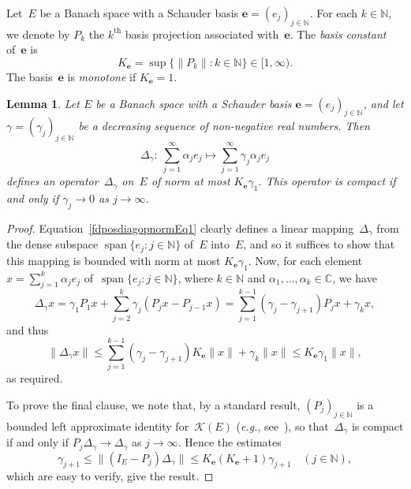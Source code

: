 \documentclass[12pt]{amsart}
\newtheorem{lemma}[theorem]{Lemma}
\theoremstyle{definition}
\numberwithin{equation}{section}
\begin{document}
Let~$E$ be a Banach space with a Schauder basis $\mathbf{e} =
(e_j)_{j\in{\ensuremath{\mathbb{N}}}}$. For each $k\in{\ensuremath{\mathbb{N}}}$, we denote by $P_k$ the
$k^{\text{th}}$ basis projection associated with~$\mathbf{e}$. The
\emph{basis constant} of~$\mathbf{e}$ is \[ K_{\mathbf{e}} =
\sup\bigl\{\| P_k\| : k\in{\ensuremath{\mathbb{N}}}\bigr\}\in [1,\infty). \] The
  basis~$\mathbf{e}$ is \emph{monotone} if $K_{\mathbf{e}} = 1$.
\begin{lemma}\label{fdposdiagopnorm}
  Let $E$ be a Banach space with a Schauder basis $\mathbf{e} =
  (e_j)_{j\in{\ensuremath{\mathbb{N}}}}$, and let $\gamma = (\gamma_j)_{j\in{\ensuremath{\mathbb{N}}}}$ be a
  decreasing sequence of non-negative real numbers. Then
  \begin{equation}\label{fdposdiagopnormEq1}
    \Delta_\gamma\colon\ \sum_{j=1}^\infty\alpha_j e_j\mapsto
    \sum_{j=1}^\infty\gamma_j\alpha_j e_j
  \end{equation}
  defines an operator~$\Delta_\gamma$ on~$E$ of norm at most
  $K_{\mathbf{e}}\gamma_1$. This operator is compact if and only if
  $\gamma_j\to 0$ as $j\to\infty$.
\end{lemma}
\begin{proof} 
  Equation~\eqref{fdposdiagopnormEq1} clearly defines a linear
  mapping~$\Delta_\gamma$ from the dense subspace
  $\operatorname{span}\{e_j : j\in{\ensuremath{\mathbb{N}}}\}$ of~$E$ into~$E$, and so it
  suffices to show that this mapping is bounded with norm at most
  $K_{\mathbf{e}}\gamma_1$. Now, for each element $x =
  \sum_{j=1}^k\alpha_je_j$ of~$\operatorname{span}\{e_j :
  j\in{\ensuremath{\mathbb{N}}}\}$, where $k\in{\ensuremath{\mathbb{N}}}$ and $\alpha_1,\ldots,\alpha_k\in{\ensuremath{\mathbb{C}}}$, we
  have
  \[ \Delta_\gamma x = \gamma_1P_1x + \sum_{j=2}^k\gamma_j(P_jx -
  P_{j-1}x) = \sum_{j=1}^{k-1}(\gamma_j - \gamma_{j+1})P_jx +
  \gamma_kx, \] and thus
  \[ \|\Delta_\gamma x\|{\ensuremath{\leqslant}} \sum_{j=1}^{k-1}(\gamma_j - \gamma_{j+1})
  K_{\mathbf{e}}\|x\| + \gamma_k\|x\|{\ensuremath{\leqslant}}
  K_{\mathbf{e}}\gamma_1\|x\|, \] as required.

  To prove the final clause, we note that, by a standard result,
  $(P_j)_{j\in{\ensuremath{\mathbb{N}}}}$ is a bounded left approximate identity
  for~$\mathscr{K}(E)$ (\emph{e.g.}, see~\cite[p.~318]{dales}), so
  that~$\Delta_\gamma$ is compact if and only if
  $P_j\Delta_\gamma\to\Delta_\gamma$ as $j\to\infty$. Hence the
  estimates
  \[ \gamma_{j+1}{\ensuremath{\leqslant}}\bigl\|(I_E - P_j)\Delta_\gamma\bigr\|{\ensuremath{\leqslant}}
  K_{\mathbf{e}}(K_{\mathbf{e}}+1)\gamma_{j+1}\quad (j\in{\ensuremath{\mathbb{N}}}), \]
  which are easy to verify, give the result.
\end{proof}
\end{document}
